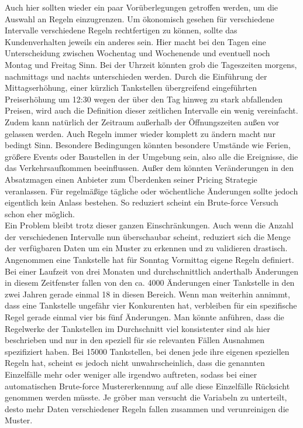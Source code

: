 \documentclass[12pt,a4paper,bibliography=totocnumbered,listof=totocnumbered]{scrartcl}
\begin{document}
Auch hier sollten wieder ein paar Vorüberlegungen getroffen werden, um die Auswahl an Regeln einzugrenzen. Um ökonomisch gesehen für verschiedene Intervalle verschiedene Regeln rechtfertigen zu können, sollte das Kundenverhalten jeweils ein anderes sein. Hier macht bei den Tagen eine Unterscheidung zwischen Wochentag und Wochenende und eventuell noch Montag und Freitag Sinn. Bei der Uhrzeit könnten grob die Tageszeiten morgens, nachmittags und nachts unterschieden werden. Durch die Einführung der Mittagserhöhung, einer kürzlich Tankstellen übergreifend eingeführten Preiserhöhung um 12:30 wegen der über den Tag hinweg zu stark abfallenden Preisen, wird auch die Definition dieser zeitlichen Intervalle ein wenig vereinfacht. Zudem kann natürlich der Zeitraum außerhalb der Öffnungszeiten außen vor gelassen werden. Auch Regeln immer wieder komplett zu ändern macht nur bedingt Sinn. Besondere Bedingungen könnten besondere Umstände wie Ferien, größere Events oder Baustellen in der Umgebung sein, also alle die Ereignisse, die das Verkehrsaufkommen beeinflussen. Außer dem könnten Veränderungen in den Absatzmagen einen Anbieter zum Überdenken seiner Pricing Strategie veranlassen. Für regelmäßige tägliche oder wöchentliche Änderungen sollte jedoch eigentlich kein Anlass bestehen. So reduziert scheint ein Brute-force Versuch schon eher möglich.\\

Ein Problem bleibt trotz dieser ganzen Einschränkungen. Auch wenn die Anzahl der verschiedenen Intervalle nun überschaubar scheint, reduziert sich die Menge der verfügbaren Daten um ein Muster zu erkennen und zu validieren drastisch. Angenommen eine Tankstelle hat für Sonntag Vormittag eigene Regeln definiert. Bei einer Laufzeit von drei Monaten und durchschnittlich anderthalb Änderungen in diesem Zeitfenster fallen von den ca. 4000 Änderungen einer Tankstelle in den zwei Jahren gerade einmal 18 in diesen Bereich. Wenn man weiterhin annimmt, dass eine Tankstelle ungefähr vier Konkurenten hat, verbleiben für ein spezifische Regel gerade einmal vier bis fünf Änderungen. Man könnte anführen, dass die Regelwerke der Tankstellen im Durchschnitt viel konsistenter sind als hier beschrieben und nur in den speziell für sie relevanten Fällen Ausnahmen spezifiziert haben. Bei 15000 Tankstellen, bei denen jede ihre eigenen speziellen Regeln hat, scheint es jedoch nicht unwahrscheinlich, dass die genannten Einzelfälle mehr oder weniger alle irgendwo auftreten, sodass bei einer automatischen Brute-force Mustererkennung auf alle diese Einzelfälle Rücksicht genommen werden müsste. Je gröber man versucht die Variabeln zu unterteilt, desto mehr Daten verschiedener Regeln fallen zusammen und verunreinigen die Muster.\\
\end{document}
